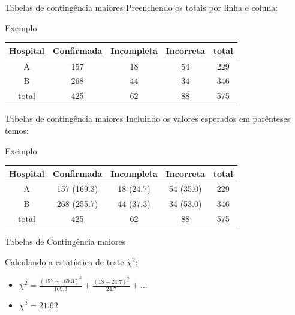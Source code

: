 \documentclass{beamer}
\begin{document}
\begin{frame}{Tabelas de contingência maiores}
  Preenchendo os totais por linha e coluna:
  \begin{exampleblock}{Exemplo}
    \begin{tabular}{c|c|c|c|c}
      Hospital & Confirmada & Incompleta &
      Incorreta & total\\
      \hline
      A & 157 & 18 & 54 & 229\\
      \hline
      B & 268 & 44 & 34 & 346\\
      \hline
      total & 425 & 62 & 88 & 575\\
    \end{tabular}
  \end{exampleblock}
\end{frame}

\begin{frame}{Tabelas de contingência maiores}
  Incluindo os valores esperados em parênteses temos:
  \begin{exampleblock}{Exemplo}
    \begin{tabular}{c|c|c|c|c}
      Hospital & Confirmada & Incompleta &
      Incorreta & total\\
      \hline
      A & 157 (169.3) & 18 (24.7) & 54 (35.0) & 229\\
      \hline
      B & 268 (255.7) & 44 (37.3) & 34 (53.0) & 346\\
      \hline
      total & 425 & 62 & 88 & 575\\
    \end{tabular}
  \end{exampleblock}
\end{frame}

\begin{frame}{Tabelas de Contingência maiores}

  Calculando a estatística de teste $\chi^2$:

  \begin{itemize}
  \item $\chi^2 = \frac{(157 - 169.3)^2}{169.3} +
  \frac{(18-24.7)^2}{24.7}  + \ldots$
\item $\chi^2 = 21.62$
\end{itemize}
\end{frame}
\end{document}
